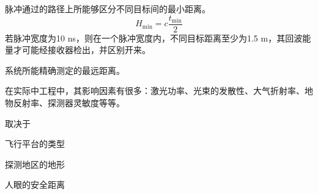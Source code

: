 脉冲通过的路径上所能够区分不同目标间的最小距离。
\begin{equation}
H_{\min} = c \dfrac{t_{\min}}{2}
\end{equation}
若脉冲宽度为10 ns，则在一个脉冲宽度内，不同目标距离至少为1.5 m，其回波能量才可能经接收器检出，并区别开来。

系统所能精确测定的最远距离。

在实际中工程中，其影响因素有很多：激光功率、光束的发散性、大气折射率、地物反射率、探测器灵敏度等等。

取决于
\begin{itemize*}
	\item 飞行平台的类型
	\item 探测地区的地形
	\item 人眼的安全距离
\end{itemize*}

